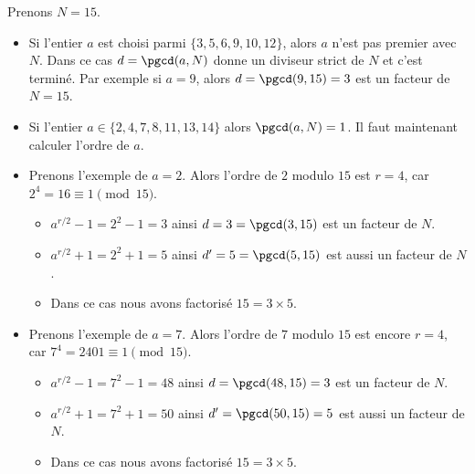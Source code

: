 \documentclass[11pt,class=report,crop=false]{standalone}
\begin{document}
Prenons $N=15$.
\begin{itemize}
	\item Si l'entier $a$ est choisi parmi $\{3,5,6,9,10,12\}$, alors
	$a$ n'est pas premier avec $N$. Dans ce cas $d = \pgcd(a,N)$ donne un diviseur strict de $N$ et c'est terminé.
	Par exemple si $a=9$, alors $d=\pgcd(9,15)=3$ est un facteur de $N=15$.

	\item Si l'entier $a \in \{2,4,7,8,11,13,14\}$ alors $\pgcd(a,N)=1$.
	Il faut maintenant calculer l'ordre de $a$.
	
	\item Prenons l'exemple de $a=2$. Alors l'ordre de $2$ modulo $15$ est $r=4$, car $2^4 = 16 \equiv 1 \pmod{15}$.
    \begin{itemize}
    	\item $a^{r/2}-1=2^2-1=3$ ainsi $d=3=\pgcd(3,15)$ est un facteur de $N$.
    	\item $a^{r/2}+1=2^2+1=5$ ainsi $d'=5=\pgcd(5,15)$ est aussi un facteur de $N$.
    	\item Dans ce cas nous avons factorisé $15 = 3\times 5$.
    \end{itemize}

	\item Prenons l'exemple de $a=7$. Alors l'ordre de $7$ modulo $15$ est encore $r=4$, car $7^4 = 2401 \equiv 1 \pmod{15}$.
    \begin{itemize}
    	\item $a^{r/2}-1=7^2-1=48$ ainsi $d=\pgcd(48,15)=3$ est un facteur de $N$.
    	\item $a^{r/2}+1=7^2+1=50$ ainsi $d'=\pgcd(50,15)=5$ est aussi un facteur de $N$.
    	\item Dans ce cas nous avons factorisé $15 = 3\times 5$.
    \end{itemize}
\end{itemize}
\end{document}
